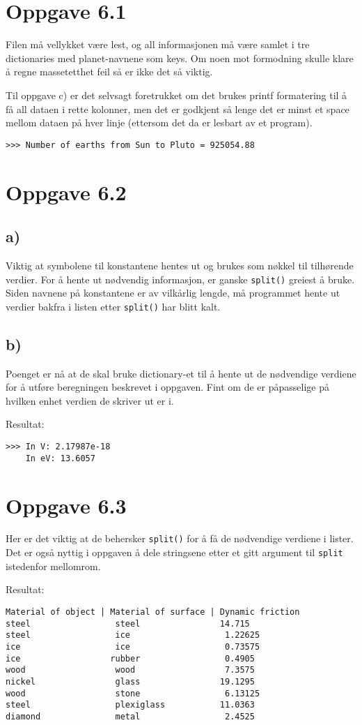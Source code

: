 \documentclass[10pt,a4paper]{article}
\begin{document}
\section*{Oppgave 6.1}
Filen må vellykket være lest, og all informasjonen må være samlet i tre dictionaries med planet-navnene som keys. Om noen mot formodning skulle klare å regne massetetthet feil så er ikke det så viktig.

Til oppgave c) er det selvsagt foretrukket om det brukes printf formatering til å få all dataen i rette kolonner, men det er godkjent så lenge det er minst et space mellom dataen på hver linje (ettersom det da er lesbart av et program).



\begin{verbatim}
>>> Number of earths from Sun to Pluto = 925054.88
\end{verbatim}
\newpage	
\section*{Oppgave 6.2}
\subsection*{a)}
Viktig at symbolene til konstantene hentes ut og brukes som nøkkel til tilhørende verdier. For å hente ut nødvendig informasjon, er ganske \texttt{split()} greiest å bruke. Siden navnene på konstantene er av vilkårlig lengde, må programmet hente ut verdier bakfra i listen etter \texttt{split()} har blitt kalt.
\subsection*{b)}
Poenget er nå at de skal bruke dictionary-et til å hente ut de nødvendige verdiene for å utføre beregningen beskrevet i oppgaven. Fint om de er påpasselige på hvilken enhet verdien de skriver ut er i.  

Resultat:
\begin{verbatim}
>>> In V: 2.17987e-18
    In eV: 13.6057
\end{verbatim}
\newpage
\section*{Oppgave 6.3}
Her er det viktig at de behersker \texttt{split()} for å få de nødvendige verdiene i lister. Det er også nyttig i oppgaven å dele stringsene etter et gitt argument til \texttt{split} istedenfor mellomrom.

Resultat:
\begin{verbatim}
Material of object | Material of surface | Dynamic friction
steel                 steel                14.715 
steel                 ice                   1.22625 
ice                   ice                   0.73575 
ice                  rubber                 0.4905 
wood                  wood                  7.3575 
nickel                glass                19.1295 
wood                  stone                 6.13125 
steel                 plexiglass           11.0363 
diamond               metal                 2.4525 
\end{verbatim}
\newpage
\end{document}
